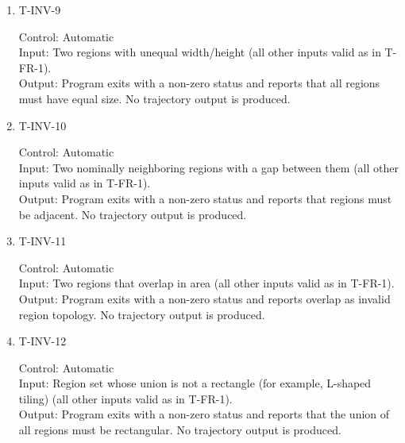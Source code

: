 \documentclass[12pt, titlepage]{article}
\begin{document}
\begin{enumerate}
Output: Program exits with a non-zero status and reports that region edges must
be axis-aligned. No trajectory output is produced.

\item{T-INV-9\\}

Control: Automatic\\

Input: Two regions with unequal width/height
(all other inputs valid as in T-FR-1).\\

Output: Program exits with a non-zero status and reports that all regions must
have equal size. No trajectory output is produced.

\item{T-INV-10\\}

Control: Automatic\\

Input: Two nominally neighboring regions with a gap between them
(all other inputs valid as in T-FR-1).\\

Output: Program exits with a non-zero status and reports that regions must be
adjacent. No trajectory output is produced.

\item{T-INV-11\\}

Control: Automatic\\

Input: Two regions that overlap in area
(all other inputs valid as in T-FR-1).\\

Output: Program exits with a non-zero status and reports overlap as invalid
region topology. No trajectory output is produced.

\item{T-INV-12\\}

Control: Automatic\\

Input: Region set whose union is not a rectangle (for example, L-shaped tiling)
(all other inputs valid as in T-FR-1).\\

Output: Program exits with a non-zero status and reports that the union of all
regions must be rectangular. No trajectory output is produced.

\end{enumerate}
\end{document}
